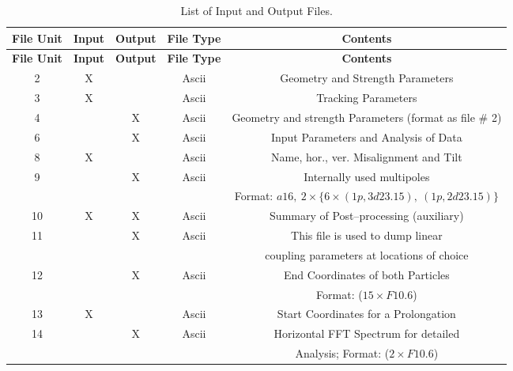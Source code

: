 \documentclass[a4paper,11pt]{report}
\begin{document}
\begin{center}
\begin{longtable}{|c|c|c|c|c|}
  \caption{List of Input and Output Files.}\\
  \hline
  \rule[-5mm]{0mm}{12.5mm} {\bf File Unit} & {\bf Input} & {\bf Output} & {\bf File Type} & {\bf Contents} \\
  \hline
  \endfirsthead
  \hline
  \rule[-5mm]{0mm}{12.5mm} {\bf File Unit} & {\bf Input} & {\bf Output} & {\bf File Type} & {\bf Contents} \\
  \hline
  \endhead
  
  \rule[-3.75mm]{0mm}{10mm}
  2 & X & & Ascii & Geometry and Strength Parameters \\
  \hline \rule[-3.75mm]{0mm}{10mm}
  3 & X & & Ascii & Tracking Parameters \\*
  \hline \rule[-3.75mm]{0mm}{10mm} 4 & & X & Ascii & Geometry and
  strength Parameters (format as file \#
  2) \\
  \hline \rule[-3.75mm]{0mm}{10mm}
  6 & & X & Ascii & Input Parameters and Analysis of Data \\
  \hline \rule[-3.75mm]{0mm}{10mm}
  8 & X & & Ascii & Name, hor., ver. Misalignment and Tilt \\
  \hline \rule[-1.25mm]{0mm}{7.5mm}
  9 & & X & Ascii & Internally used multipoles \\*
  \rule[-3.7mm]{0mm}{7.5mm}
  & & & & Format: $a16,\ 2 \times \{6 \times (1p,3d23.15),\
  (1p,2d23.15)\}$ \\ 
  \hline \rule[-3.75mm]{0mm}{10mm}
  10 & X & X & Ascii & Summary of Post--processing (auxiliary) \\
  \hline \rule[-3.75mm]{0mm}{10mm}
  11 & & X & Ascii & This file is used to dump linear \\*
  \rule[-3.7mm]{0mm}{7.5mm}
  & & & & coupling parameters at locations of choice \\
  \hline \rule[-1.25mm]{0mm}{7.5mm}
  12 & & X & Ascii & End Coordinates of both Particles \\*
  \rule[-3.7mm]{0mm}{7.5mm}
  & & & & Format: ($15 \times F10.6$) \\
  \hline \rule[-3.75mm]{0mm}{10mm}
  13 & X & & Ascii & Start Coordinates for a Prolongation \\
  \hline \rule[-1.25mm]{0mm}{7.5mm}
  14 & & X & Ascii & Horizontal FFT Spectrum for detailed \\*
  \rule[-3.7mm]{0mm}{7.5mm}
  & & & & Analysis; Format:  ($2 \times F10.6$) \\

\end{longtable}
\end{center}
\end{document}
